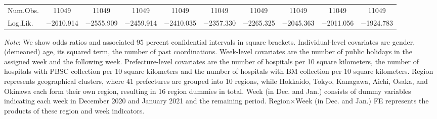 \documentclass[12pt, a4paper]{article}
\begin{document}
\begin{landscape}
\begin{table}[H]
\begin{threeparttable}
\begin{tabular}[t]{lccccccccc}
Num.Obs. & \num{11049} & \num{11049} & \num{11049} & \num{11049} & \num{11049} & \num{11049} & \num{11049} & \num{11049} & \num{11049}\\
Log.Lik. & \num{-2610.914} & \num{-2555.909} & \num{-2459.914} & \num{-2410.035} & \num{-2357.330} & \num{-2265.325} & \num{-2045.363} & \num{-2011.056} & \num{-1924.783}\\
\bottomrule
\end{tabular}
\begin{tablenotes}
\item \emph{Note}: We show odds ratios and associated 95 percent confidential intervals in square brackets. Individual-level covariates are gender, (demeaned) age, its squared term, the number of past coordinations. Week-level covariates are the number of public holidays in the assigned week and the following week. Prefecture-level covariates are the number of hospitals per 10 square kilometers, the number of hospitals with PBSC collection per 10 square kilometers and the number of hospitals with BM collection per 10 square kilometers. Region represents geographical clusters, where 41 prefectures are grouped into 10 regions, while Hokkaido, Tokyo, Kanagawa, Aichi, Osaka, and Okinawa each form their own region, resulting in 16 region dummies in total. Week (in Dec. and Jan.) consists of dummy variables indicating each week in December 2020 and January 2021 and the remaining period. Region$\times$Week (in Dec. and Jan.) FE represents the products of these region and week indicators.
\end{tablenotes}
\end{threeparttable}
\end{table}
\end{landscape}

\clearpage


\end{document}
